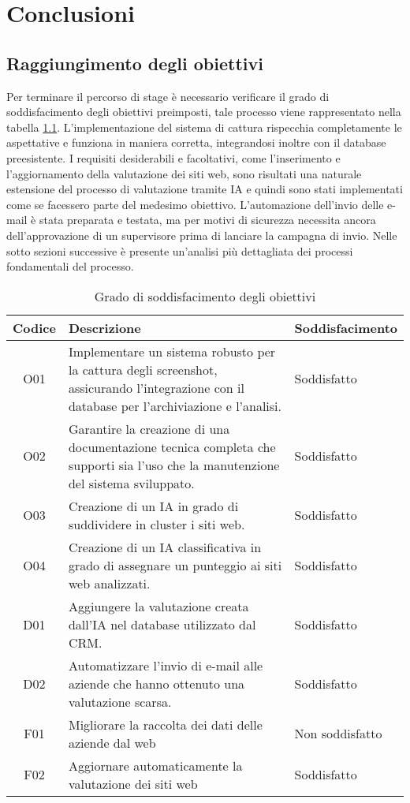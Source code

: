 \chapter{Conclusioni}
\label{cap:conclusioni}


\section{Raggiungimento degli obiettivi}
Per terminare il percorso di stage è necessario verificare il grado di soddisfacimento degli obiettivi preimposti, tale processo viene rappresentato nella tabella \ref{soddisfazione}.
L'implementazione del sistema di cattura rispecchia completamente le aspettative e funziona in maniera corretta, integrandosi inoltre con il database preesistente.
I requisiti desiderabili e facoltativi, come l'inserimento e l'aggiornamento della valutazione dei siti web, sono risultati una naturale estensione del processo di valutazione tramite IA e quindi sono stati implementati come se facessero parte del medesimo obiettivo.
L'automazione dell'invio delle e-mail è stata preparata e testata, ma per motivi di sicurezza necessita ancora dell'approvazione di un supervisore prima di lanciare la campagna di invio.
Nelle sotto sezioni successive è presente un'analisi più dettagliata dei processi fondamentali del processo.

\newpage
\begin{table}[!htbp]
    \centering
    \begin{tabularx}{0.8\textwidth}{|c|X|X|}
    \hline
    \textbf{Codice} & \textbf{Descrizione} & \textbf{Soddisfacimento}\\
    \hline
    O01 & Implementare un sistema robusto per la cattura degli screenshot, assicurando l’integrazione con il database per l’archiviazione e l’analisi. & Soddisfatto\\
    \hline
    O02 & Garantire la creazione di una documentazione tecnica completa che supporti sia l’uso che la manutenzione  del sistema sviluppato. & Soddisfatto\\
    \hline
    O03 & Creazione di un IA in grado di suddividere in cluster i siti web. & Soddisfatto\\
    \hline
    O04 & Creazione di un IA classificativa in grado di assegnare un punteggio ai siti web analizzati. & Soddisfatto\\
    \hline
    D01 & Aggiungere la valutazione creata dall'IA nel database utilizzato dal CRM. & Soddisfatto\\
    \hline
    D02 & Automatizzare l'invio di e-mail alle aziende che hanno ottenuto una valutazione scarsa. & Soddisfatto\\
    \hline
    F01 & Migliorare la raccolta dei dati delle aziende dal web & Non soddisfatto\\
    \hline
    F02 & Aggiornare automaticamente la valutazione dei siti web & Soddisfatto\\
    \hline
    \end{tabularx}
    \caption{Grado di soddisfacimento degli obiettivi}
    \label{soddisfazione}
\end{table}


